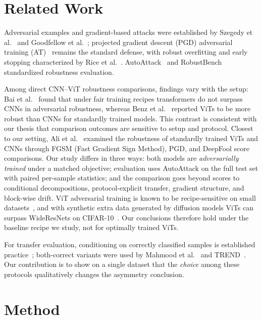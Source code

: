 \documentclass[conference]{IEEEtran}
\begin{document}
\section{Related Work}
Adversarial examples and gradient-based attacks were established by Szegedy et al.~\cite{szegedy2014intriguing} and Goodfellow et al.~\cite{goodfellow2015explaining}; projected gradient descent (PGD) adversarial training (AT)~\cite{madry2018towards} remains the standard defense, with robust overfitting and early stopping characterized by Rice et al.~\cite{rice2020overfitting}. AutoAttack~\cite{croce2020reliable} and RobustBench~\cite{croce2021robustbench} standardized robustness evaluation.

Among direct CNN--ViT robustness comparisons, findings vary with the setup: Bai et al.~\cite{bai2021transformers} found that under fair training recipes transformers do not surpass CNNs in adversarial robustness, whereas Benz et al.~\cite{benz2021adversarial} reported ViTs to be more robust than CNNs for standardly trained models. This contrast is consistent with our thesis that comparison outcomes are sensitive to setup and protocol. Closest to our setting, Ali et al.~\cite{ali2024adversarial} examined the robustness of standardly trained ViTs and CNNs through FGSM (Fast Gradient Sign Method), PGD, and DeepFool score comparisons. Our study differs in three ways: both models are \emph{adversarially trained} under a matched objective; evaluation uses AutoAttack on the full test set with paired per-sample statistics; and the comparison goes beyond scores to conditional decompositions, protocol-explicit transfer, gradient structure, and block-wise drift. ViT adversarial training is known to be recipe-sensitive on small datasets~\cite{mo2022adversarial, debenedetti2023light}, and with synthetic extra data generated by diffusion models ViTs can surpass WideResNets on CIFAR-10~\cite{wu2025vision}. Our conclusions therefore hold under the baseline recipe we study, not for optimally trained ViTs.

For transfer evaluation, conditioning on correctly classified samples is established practice~\cite{liu2017delving, dong2018boosting, mahmood2021robustness, ravikumar2023trend}; both-correct variants were used by Mahmood et al.~\cite{mahmood2021robustness} and TREND~\cite{ravikumar2023trend}. Our contribution is to show on a single dataset that the \emph{choice} among these protocols qualitatively changes the asymmetry conclusion.

\section{Method}
\end{document}
